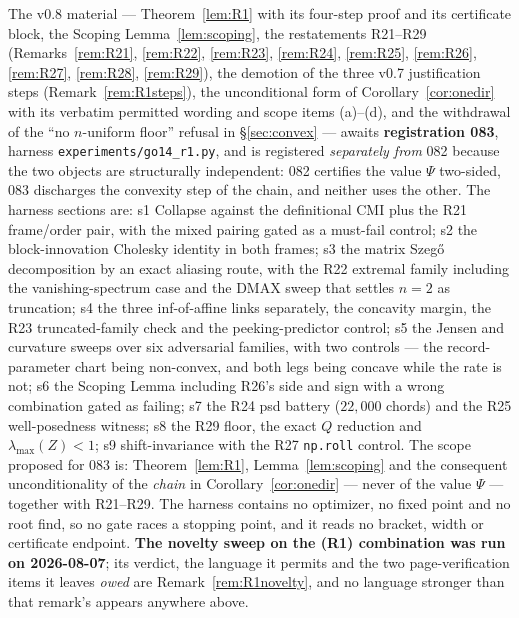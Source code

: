 \documentclass[11pt]{article}
\theoremstyle{definition}
\theoremstyle{remark}
\begin{document}
The v0.8 material --- Theorem~\ref{lem:R1} with its four-step proof and
its certificate block, the Scoping Lemma~\ref{lem:scoping}, the
restatements R21--R29 (Remarks~\ref{rem:R21}, \ref{rem:R22},
\ref{rem:R23}, \ref{rem:R24}, \ref{rem:R25}, \ref{rem:R26},
\ref{rem:R27}, \ref{rem:R28}, \ref{rem:R29}), the demotion of the three
v0.7 justification steps (Remark~\ref{rem:R1steps}), the
unconditional form of Corollary~\ref{cor:onedir} with its verbatim
permitted wording and scope items (a)--(d), and the withdrawal of the
``no $n$-uniform floor'' refusal in \S\ref{sec:convex} --- awaits
\textbf{registration 083}, harness
\texttt{experiments/go14\_r1.py}, and is registered
\emph{separately from} 082 because the two objects are structurally
independent: 082 certifies the value $\Psi$ two-sided, 083 discharges
the convexity step of the chain, and neither uses the other. The
harness sections are: s1 Collapse against the definitional CMI plus the
R21 frame/order pair, with the mixed pairing gated as a must-fail
control; s2 the block-innovation Cholesky identity in both frames; s3
the matrix Szeg\H o decomposition by an exact aliasing route, with the
R22 extremal family including the vanishing-spectrum case and the
DMAX sweep that settles $n=2$ as truncation; s4 the three inf-of-affine
links separately, the concavity margin, the R23 truncated-family check
and the peeking-predictor control; s5 the Jensen and curvature sweeps
over six adversarial families, with two controls --- the
record-parameter chart being non-convex, and both legs being concave
while the rate is not; s6 the Scoping Lemma including R26's side and
sign with a wrong combination gated as failing; s7 the R24 psd battery
($22{,}000$ chords) and the R25 well-posedness witness; s8 the R29
floor, the exact $Q$ reduction and $\lambda_{\max}(Z)<1$; s9
shift-invariance with the R27 \texttt{np.roll} control. The scope
proposed for 083 is: Theorem~\ref{lem:R1}, Lemma~\ref{lem:scoping} and
the consequent unconditionality of the \emph{chain} in
Corollary~\ref{cor:onedir} --- never of the value $\Psi$ --- together
with R21--R29. The harness contains no optimizer, no fixed point and no
root find, so no gate races a stopping point, and it reads no bracket,
width or certificate endpoint. \textbf{The novelty sweep on the (R1)
combination was run on 2026-08-07}; its verdict, the language it
permits and the two page-verification items it leaves \emph{owed} are
Remark~\ref{rem:R1novelty}, and no language stronger than that
remark's appears anywhere above.
\end{document}
